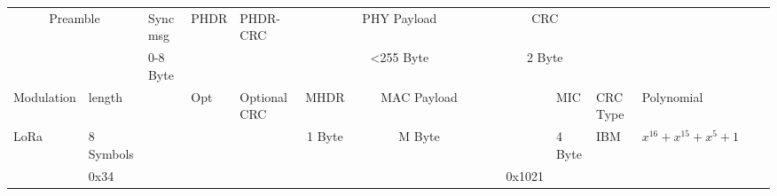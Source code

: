 \begin{table}[h!]

\fontsize{3pt}{3pt}\selectfont

\centering
\begin{tabular}{llllllllllllllllllllllllll}

\multicolumn{2}{c}{Preamble}				&	Sync msg 	&	PHDR  			&	PHDR-CRC 			&	\multicolumn{15}{c}{PHY Payload}																																																																																																																																																																																																																																																																																				&	\multicolumn{2}{c}{CRC }		\\
\multicolumn{2}{c}{}								&	0-8 Byte			&																		&																						&	\multicolumn{15}{c}{ <255 Byte}																																																																																																																																																																																																																																																																																			&	\multicolumn{2}{c}{2 Byte}									\\
Modulation	&	length		&								&	Opt										&	Optional CRC															&	\multicolumn{3}{c}{MHDR }																										&	\multicolumn{11}{c}{MAC Payload}																																																																																																																																																																								&																							&																								& MIC 	&	CRC Type		&	Polynomial										\\
LoRa			&	8 Symbols									&								&																		&																						&	\multicolumn{3}{c}{1 Byte}																															&	\multicolumn{11}{c}{M Byte }																																																																																																																																																																	&																							&																								& 4 Byte												&	IBM					&	$x^{16} + x^{15} + x^{5} + 1$					\\
				&	0x34 					&								&																		&																						&															&															&															&																											&														&																							&																		&																			&																																	&																																		&																	&																							&																								&																& 						&	0x1021												\\

\end{tabular}
\end{table}
